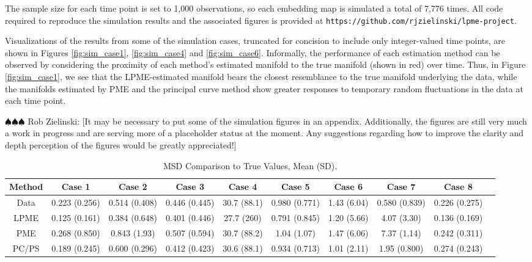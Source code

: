 \documentclass[11pt,reqno]{article}
\newcommand{\zielinski}[1]{{\color{blue} \sf $\spadesuit\spadesuit\spadesuit$ Rob Zielinski: [#1]}}
\theoremstyle{definition}
\begin{document}
The sample size for each time point is set to 1,000 observations, so each embedding map is simulated a total of 7,776 times. All code required to reproduce the simulation results and the associated figures is provided at \texttt{https://github.com/rjzielinski/lpme-project}.

Visualizations of the results from some of the simulation cases, truncated for concision to include only integer-valued time points, are shown in Figures \ref{fig:sim_case1}, \ref{fig:sim_case4} and \ref{fig:sim_case6}. Informally, the performance of each estimation method can be observed by considering the proximity of each method's estimated manifold to the true manifold (shown in red) over time. Thus, in Figure \ref{fig:sim_case1}, we see that the LPME-estimated manifold bears the closest resemblance to the true manifold underlying the data, while the manifolds estimated by PME and the principal curve method show greater responses to temporary random fluctuations in the data at each time point.

\zielinski{It may be necessary to put some of the simulation figures in an appendix. Additionally, the figures are still very much a work in progress and are serving more of a placeholder status at the moment. Any suggestions regarding how to improve the clarity and depth perception of the figures would be greatly appreciated!}

\begin{table}[h]
\footnotesize
  \centering
  \begin{tabular}{|c c c c c c c c c c|}
    \hline
    Method & Case 1 & Case 2 & Case 3 & Case 4 & Case 5 & Case 6 & Case 7 & Case 8 \\
    \hline
    Data & 0.223 (0.256) & 0.514 (0.408) & 0.446 (0.445) & 30.7 (88.1) & 0.980 (0.771) & 1.43 (6.04) & 0.580 (0.839) & 0.226 (0.275) \\
    LPME & 0.125 (0.161) & 0.384 (0.648) & 0.401 (0.446) & 27.7 (260) & 0.791 (0.845) & 1.20 (5.66) & 4.07 (3.30) & 0.136 (0.169) \\
    PME & 0.268 (0.850) & 0.843 (1.93) & 0.507 (0.594) & 30.7 (88.2) & 1.04 (1.07) & 1.47 (6.06) & 7.37 (1.14) & 0.242 (0.311) \\
    PC/PS & 0.189 (0.245) & 0.600 (0.296) & 0.412 (0.423) & 30.6 (88.1) & 0.934 (0.713) & 1.01 (2.11) & 1.95 (0.800) & 0.274 (0.243) \\
    \hline
  \end{tabular}
  \caption{MSD Comparison to True Values, Mean (SD).}
  \label{table:simulation_results_mean}
\end{table}
\end{document}
